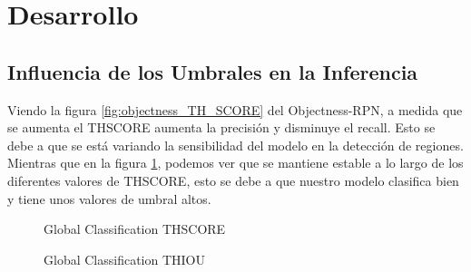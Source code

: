 \section{Desarrollo}


\subsection{Influencia de los Umbrales en la Inferencia}

Viendo la figura \ref{fig:objectness_TH_SCORE} del Objectness-RPN, a medida que se aumenta el TH\textunderscore SCORE aumenta la precisión y disminuye el recall. Esto se debe a que se está variando la sensibilidad del modelo en la detección de regiones. Mientras que en la figura \ref{fig:global_TH_SCORE}, podemos ver que se mantiene estable a lo largo de los diferentes valores de TH\textunderscore SCORE, esto se debe a que nuestro modelo clasifica bien y tiene unos valores de umbral altos.


\begin{figure}[h]
\centering
\begin{minipage}[t]{.5\textwidth}
  \centering
  \resizebox{\linewidth}{!}{}
  \captionsetup{font=footnotesize}
  \caption{Objectness-RPN TH\textunderscore SCORE}
  \label{fig:objectness_TH_SCORE}
\end{minipage}%
\begin{minipage}[t]{.5\textwidth}
  \centering
  \resizebox{\linewidth}{!}{}
  \captionsetup{font=footnotesize}
  \caption{Global Classification TH\textunderscore SCORE}
  \label{fig:global_TH_SCORE}
\end{minipage}
\end{figure}


\begin{figure}[h]
\centering
\begin{minipage}[t]{.5\textwidth}
  \centering
  \resizebox{\linewidth}{!}{}
  \captionsetup{font=footnotesize}
  \caption{Objectness-RPN TH\textunderscore IOU}
  \label{fig:objectness_TH_IOU}
\end{minipage}%
\begin{minipage}[t]{.5\textwidth}
  \centering
  \resizebox{\linewidth}{!}{}
  \captionsetup{font=footnotesize}
  \caption{Global Classification TH\textunderscore IOU}
  \label{fig:global_TH_IOU}
\end{minipage}
\end{figure}


